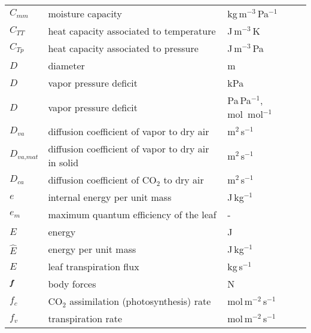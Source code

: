 \begin{longtable}{p{}p{}p{}}
	$C_{\textit{mm}}$ & moisture capacity & kg\,m$^{-3}$\,Pa$^{-1}$\\ 	
	$C_{\textit{TT}}$ & heat capacity associated to temperature & J\,m$^{-3}$\,K\\ 		
	$C_{\textit{Tp}}$ & heat capacity associated to pressure & J\,m$^{-3}$\,Pa\\ 			
	$D$ & diameter & m \\ 
	$D$ & vapor pressure deficit & kPa\\ 	
	$D$ & vapor pressure deficit & Pa\,Pa$^{-1}$, mol~mol$^{-1}$\\ 	
	$D_{\textit{va}}$ & diffusion coefficient of vapor to dry air & m$^2$\,s$^{-1}$\\ 		
	$D_{\textit{va,mat}}$ & diffusion coefficient of vapor to dry air in solid & m$^2$\,s$^{-1}$\\ 			
	$D_{\textit{ca}}$ & diffusion coefficient of CO$_2$ to dry air & m$^2$\,s$^{-1}$\\ 			
	$e$ & internal energy per unit mass & J\,kg$^{-1}$\\ 
	$e_m$ & maximum quantum efficiency of the leaf & - \\ 
	$E$ & energy & J\\
	$\hat{E}$ & energy per unit mass & J\,kg$^{-1}$\\	
	$E$ & leaf transpiration flux & kg\,s$^{-1}$ \\

	$\textbf{\textit{f}}$ & body forces & N\\

	$f_c$ & CO$_2$ assimilation (photosynthesis) rate & mol\,m$^{-2}$\,s$^{-1}$ \\
	$f_v$ & transpiration rate & mol\,m$^{-2}$\,s$^{-1}$ \\	
	

\end{longtable}
